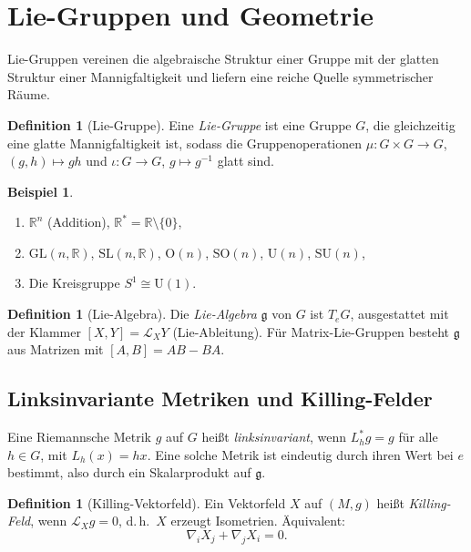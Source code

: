 \documentclass[12pt,a4paper]{amsart}
\theoremstyle{definition}
\newtheorem{definition}[theorem]{Definition}
\newtheorem{beispiel}[theorem]{Beispiel}
\begin{document}
\section{Lie-Gruppen und Geometrie}
\label{sec:liegruppen}

Lie-Gruppen vereinen die algebraische Struktur einer Gruppe mit der glatten
Struktur einer Mannigfaltigkeit und liefern eine reiche Quelle symmetrischer Räume.

\begin{definition}[Lie-Gruppe]
Eine \emph{Lie-Gruppe} ist eine Gruppe $G$, die gleichzeitig eine glatte
Mannigfaltigkeit ist, sodass die Gruppenoperationen $\mu: G \times G \to G$,
$(g,h) \mapsto gh$ und $\iota: G \to G$, $g \mapsto g^{-1}$ glatt sind.
\end{definition}

\begin{beispiel}
\begin{enumerate}[label=(\alph*)]
  \item $\mathbb{R}^n$ (Addition), $\mathbb{R}^* = \mathbb{R} \setminus \{0\}$,
  \item $\mathrm{GL}(n,\mathbb{R})$, $\mathrm{SL}(n,\mathbb{R})$, $\mathrm{O}(n)$, $\mathrm{SO}(n)$, $\mathrm{U}(n)$, $\mathrm{SU}(n)$,
  \item Die Kreisgruppe $S^1 \cong \mathrm{U}(1)$.
\end{enumerate}
\end{beispiel}

\begin{definition}[Lie-Algebra]
Die \emph{Lie-Algebra} $\mathfrak{g}$ von $G$ ist $T_eG$, ausgestattet mit
der Klammer $[X, Y] = \mathcal{L}_X Y$ (Lie-Ableitung). Für Matrix-Lie-Gruppen
besteht $\mathfrak{g}$ aus Matrizen mit $[A,B] = AB - BA$.
\end{definition}

\subsection{Linksinvariante Metriken und Killing-Felder}

Eine Riemannsche Metrik $g$ auf $G$ heißt \emph{linksinvariant}, wenn
$L_h^* g = g$ für alle $h \in G$, mit $L_h(x) = hx$. Eine solche Metrik
ist eindeutig durch ihren Wert bei $e$ bestimmt, also durch ein Skalarprodukt
auf $\mathfrak{g}$.

\begin{definition}[Killing-Vektorfeld]
Ein Vektorfeld $X$ auf $(M, g)$ heißt \emph{Killing-Feld}, wenn
$\mathcal{L}_X g = 0$, d.\,h.\ $X$ erzeugt Isometrien. Äquivalent:
\[
  \nabla_i X_j + \nabla_j X_i = 0.
\]
\end{definition}
\end{document}
